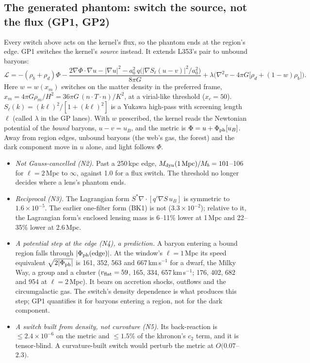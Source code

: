 \documentclass[10pt]{article}
\begin{document}
\subsection{The generated phantom: switch the source, not the flux (GP1, GP2)}
Every switch above acts on the kernel's flux, so the phantom ends at the region's edge. GP1 switches the kernel's \emph{source} instead. It extends L353's pair to unbound baryons:
\begin{equation}
\mathcal L=-(\rho_b+\rho_d)\Phi-\frac{2\nabla\Phi\!\cdot\!\nabla u-|\nabla u|^2-a_0^2\,q\big(|\nabla S_\ell(u-v)|^2/a_0^2\big)}{8\pi G}+\lambda\Big(\nabla^2v-4\pi G\big[\rho_d+(1-w)\rho_b\big]\Big).
\end{equation}
Here $w=w(x_m)$ switches on the matter density in the preferred frame, $x_m=4\pi G\rho_m/H^2=36\pi G\,(n\!\cdot\!T\!\cdot\!n)/K^2$, at a virial-like threshold ($x_c=50$). $S_\ell(k)=(k\ell)^2/[1+(k\ell)^2]$ is a Yukawa high-pass with screening length $\ell$ (called $\lambda$ in the GP lanes).
With $w$ prescribed, the kernel reads the Newtonian potential of the \emph{bound} baryons, $u-v=u_B$, and the metric is $\Phi=u+\Phi_{\rm ph}[u_B]$. Away from region edges, unbound baryons (the web's gas, the forest) and the dark component move in $u$ alone, and light follows $\Phi$.
\begin{itemize}
\item \emph{Not Gauss-cancelled (N2).} Past a 250\,kpc edge, $M_{\rm dyn}(1\,{\rm Mpc})/M_b=101$--106 for $\ell=2$\,Mpc to $\infty$, against 1.0 for a flux switch. The threshold no longer decides where a lens's phantom ends.
\item \emph{Reciprocal (N3).} The Lagrangian form $S^*\nabla\!\cdot[q'\nabla S\,u_B]$ is symmetric to $1.6\times10^{-5}$. The earlier one-filter form (BK1) is not ($3.3\times10^{-2}$); relative to it, the Lagrangian form's enclosed lensing mass is 6--11\% lower at 1\,Mpc and 22--35\% lower at 2.6\,Mpc.
\item \emph{A potential step at the edge (N4), a prediction.} A baryon entering a bound region falls through $|\Phi_{\rm ph}({\rm edge})|$. At the window's $\ell=1$\,Mpc its speed equivalent $\sqrt{2|\Phi_{\rm ph}|}$ is 161, 352, 563 and 667\,km\,s$^{-1}$ for a dwarf, the Milky Way, a group and a cluster ($v_{\rm flat}=59$, 165, 334, 657\,km\,s$^{-1}$; 176, 402, 682 and 954 at $\ell=2$\,Mpc). It bears on accretion shocks, outflows and the circumgalactic gas. The switch's density dependence is what produces this step; GP1 quantifies it for baryons entering a region, not for the dark component.
\item \emph{A switch built from density, not curvature (N5).} Its back-reaction is $\leq2.4\times10^{-6}$ on the metric and $\leq1.5\%$ of the khronon's $c_2$ term, and it is tensor-blind. A curvature-built switch would perturb the metric at $O(0.07$--$2.3)$.
\end{itemize}
\end{document}
